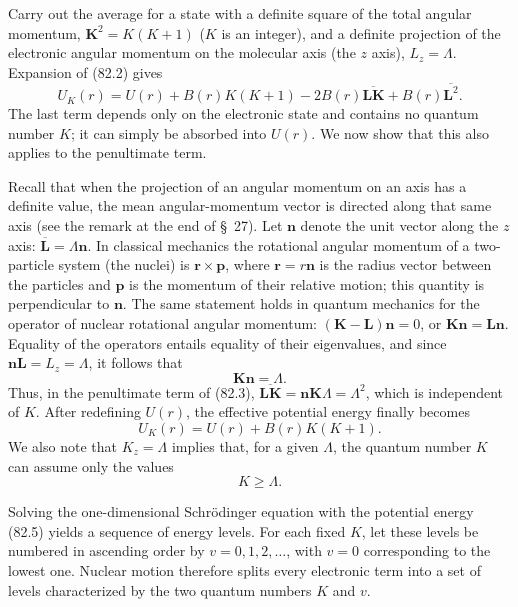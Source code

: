 Carry out the average for a state with a definite square of the total angular momentum, $\mathbf K^2=K(K+1)$ ($K$ is an integer), and a definite projection of the electronic angular momentum on the molecular axis (the $z$ axis), $L_z=\Lambda$. Expansion of (82.2) gives
\begin{equation}U_K(r)=U(r)+B(r)K(K+1)-2B(r)\overline{\mathbf{LK}}+B(r)\overline{\mathbf L^2}.\tag{82.3}\end{equation}
The last term depends only on the electronic state and contains no quantum number $K$; it can simply be absorbed into $U(r)$. We now show that this also applies to the penultimate term.

Recall that when the projection of an angular momentum on an axis has a definite value, the mean angular-momentum vector is directed along that same axis (see the remark at the end of \S~27). Let $\mathbf n$ denote the unit vector along the $z$ axis: $\overline{\mathbf L}=\Lambda\mathbf n$. In classical mechanics the rotational angular momentum of a two-particle system (the nuclei) is $\mathbf r\times\mathbf p$, where $\mathbf r=r\mathbf n$ is the radius vector between the particles and $\mathbf p$ is the momentum of their relative motion; this quantity is perpendicular to $\mathbf n$. The same statement holds in quantum mechanics for the operator of nuclear rotational angular momentum: $(\mathbf K-\mathbf L)\mathbf n=0$, or $\mathbf K\mathbf n=\mathbf L\mathbf n$. Equality of the operators entails equality of their eigenvalues, and since $\mathbf n\mathbf L=L_z=\Lambda$, it follows that
\begin{equation}\mathbf K\mathbf n=\Lambda.\tag{82.4}\end{equation}
Thus, in the penultimate term of (82.3), $\overline{\mathbf{LK}}=\mathbf n\mathbf K\Lambda=\Lambda^2$, which is independent of $K$. After redefining $U(r)$, the effective potential energy finally becomes
\begin{equation}U_K(r)=U(r)+B(r)K(K+1).\tag{82.5}\end{equation}
We also note that $K_z=\Lambda$ implies that, for a given $\Lambda$, the quantum number $K$ can assume only the values
\begin{equation}K\geqslant\Lambda.\tag{82.6}\end{equation}

Solving the one-dimensional Schrödinger equation with the potential energy (82.5) yields a sequence of energy levels. For each fixed $K$, let these levels be numbered in ascending order by $v=0,1,2,\ldots$, with $v=0$ corresponding to the lowest one. Nuclear motion therefore splits every electronic term into a set of levels characterized by the two quantum numbers $K$ and $v$.

